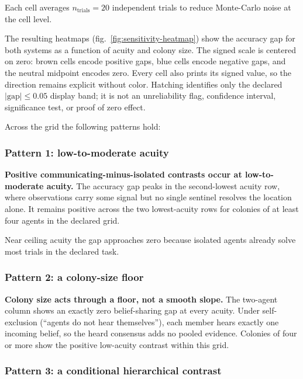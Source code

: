 \documentclass[
  english,
]{article}
\theoremstyle{plain}
\theoremstyle{definition}
\theoremstyle{remark}
\theoremstyle{definition}
\begin{document}
Each cell averages \(n_{\text{trials}} = 20\) independent trials to
reduce Monte-Carlo noise at the cell level.

The resulting heatmaps (fig.~\ref{fig:sensitivity-heatmap}) show the
accuracy gap for both systems as a function of acuity and colony size.
The signed scale is centered on zero: brown cells encode positive gaps,
blue cells encode negative gaps, and the neutral midpoint encodes zero.
Every cell also prints its signed value, so the direction remains
explicit without color. Hatching identifies only the declared
\(|\mathrm{gap}| \le 0.05\) display band; it is not an unreliability
flag, confidence interval, significance test, or proof of zero effect.

Across the grid the following patterns hold:

\subsubsection{Pattern 1: low-to-moderate
acuity}\label{pattern-1-low-to-moderate-acuity}

\textbf{Positive communicating-minus-isolated contrasts occur at
low-to-moderate acuity.} The accuracy gap peaks in the second-lowest
acuity row, where observations carry some signal but no single sentinel
resolves the location alone. It remains positive across the two
lowest-acuity rows for colonies of at least four agents in the declared
grid.

Near ceiling acuity the gap approaches zero because isolated agents
already solve most trials in the declared task.

\subsubsection{Pattern 2: a colony-size
floor}\label{pattern-2-a-colony-size-floor}

\textbf{Colony size acts through a floor, not a smooth slope.} The
two-agent column shows an exactly zero belief-sharing gap at every
acuity. Under self-exclusion (``agents do not hear themselves''), each
member hears exactly one incoming belief, so the heard consensus adds no
pooled evidence. Colonies of four or more show the positive low-acuity
contrast within this grid.

\subsubsection{Pattern 3: a conditional hierarchical
contrast}\label{pattern-3-a-conditional-hierarchical-contrast}
\end{document}
